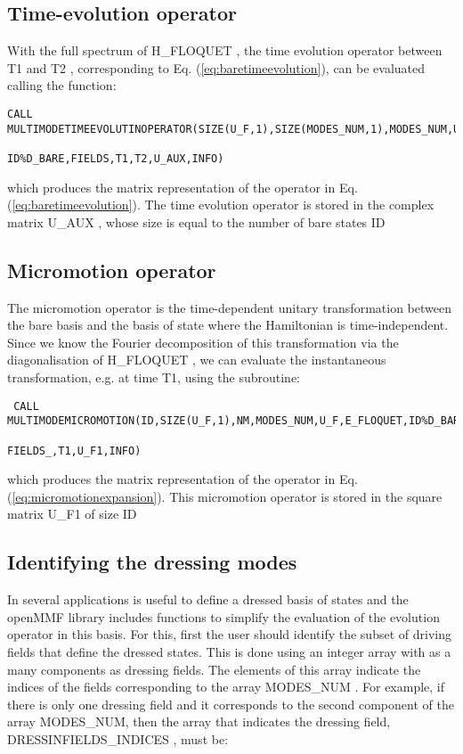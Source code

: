\documentclass[10pt,a4paper]{article}
\begin{document}
\subsection{Time-evolution operator}

With the full spectrum of   H\_FLOQUET , the time evolution operator  between   T1  and   T2 ,  corresponding to Eq. (\ref{eq:baretimeevolution}), can be evaluated calling the function:
\begin{verbatim}
CALL MULTIMODETIMEEVOLUTINOPERATOR(SIZE(U_F,1),SIZE(MODES_NUM,1),MODES_NUM,U_F,E_FLOQUET,
                                                          ID%D_BARE,FIELDS,T1,T2,U_AUX,INFO)
\end{verbatim}
which produces the matrix representation of the operator in Eq. (\ref{eq:baretimeevolution}).  The time evolution operator is stored in the complex matrix   U\_AUX , whose size is equal to the number of bare states   ID%

\subsection{Micromotion operator}

The micromotion operator is the time-dependent unitary transformation between the bare basis and the basis of state where the Hamiltonian is time-independent. Since we know the Fourier decomposition of this transformation via the diagonalisation of   H\_FLOQUET , we can evaluate the instantaneous transformation, e.g. at time   T1, using the subroutine: 

\begin{verbatim}
 CALL MULTIMODEMICROMOTION(ID,SIZE(U_F,1),NM,MODES_NUM,U_F,E_FLOQUET,ID%D_BARE,
                                                               FIELDS_,T1,U_F1,INFO)
\end{verbatim} 
which produces the matrix representation of the operator in Eq. (\ref{eq:micromotionexpansion}). This micromotion operator is stored in the square matrix   U\_F1  of size   ID%

\subsection{Identifying the dressing modes}

In several applications is useful to define a dressed basis of states and the openMMF library includes functions to simplify the evaluation of the evolution operator in this basis. For this, first the user should identify the subset of driving fields that define the dressed states. This is done using an integer array with as a many components as dressing fields. The elements of this array indicate the indices of the fields corresponding to the array   MODES\_NUM . For example, if there is only one dressing field and it corresponds to the second component of the array   MODES\_NUM, then the array that indicates the dressing field,   DRESSINFIELDS\_INDICES ,  must be:
\end{document}
